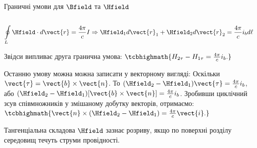 \documentclass[onlytextwidth]{beamer}
\begin{document}
\begin{frame}{Граничні умови для $\Bfield$ та $\Hfield$}{}
\begin{onlyenv}
\begin{columns}
			\begin{column}{0.4\linewidth}\centering
				
			\end{column}
		\end{columns}
		\begin{block}{}\scriptsize
			\begin{equation*}
				\oint\limits_L \Hfield\cdot d\vect{r} = \frac{4\pi}cI \Rightarrow \Hfield_1 d\vect{r}_1 +
				\Hfield_2 d\vect{r}_2 = \frac{4\pi}c i_b d\ell
			\end{equation*}
		\end{block}
		\begin{block}{}
			Звідси випливає друга гранична умова:
			\(
			\tcbhighmath{
				H_{2\tau} - H_{1\tau} = \frac{4\pi}c i_b.
			}
			\)
		\end{block}
		\begin{block}{}\justifying\scriptsize
			Останню умову можна можна записати у векторному вигляді: Оскільки $ \vect{\tau} = \vect{b}\times\vect{n} $. То $(\Hfield_2 - \Hfield_1)\vect{\tau} =
				\frac{4\pi}c i_b $, або $(\Hfield_2 - \Hfield_1)[\vect{b}\times\vect{n}] = \frac{4\pi}c i_b $. Зробивши циклічний зсув співмножників у змішаному
			добутку векторів, отримаємо:
			\(
			\tcbhighmath{
				\vect{n}\times (\Hfield_2 - \Hfield_1) = \frac{4\pi}c \vect{i}.
			}
			\)
		\end{block}
		\begin{alertblock}{}\centering\scriptsize
			Тангенціальна складова $\Hfield$ зазнає розриву, якщо по поверхні розділу середовищ течуть \alert{струми провідності}.
		\end{alertblock}
	\end{onlyenv}
\end{frame}
\end{document}

